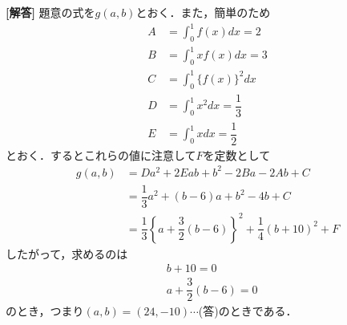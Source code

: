 \documentclass[../../main.tex]{subfiles}
\begin{document}
\begin{oframed}
  
\end{oframed}

{\bf [解答]} 題意の式を$g(a,b)$とおく．また，簡単のため
\begin{align}
  A&= \int_0^1f(x)dx=2 \\
  B&=\int_0^1xf(x)dx=3 \\
  C&=\int_0^1\{f(x)\}^2dx \\
  D&=\int_0^1x^2dx=\dfrac{1}{3} \\
  E&=\int_0^1xdx =\dfrac{1}{2}
\end{align}
とおく．するとこれらの値に注意して$F$を定数として
\begin{align}
  g(a,b)&=Da^2+2Eab+b^2-2Ba-2Ab+C \\
  &=\dfrac{1}{3}a^2+(b-6)a+b^2-4b+C \\
  &=\dfrac{1}{3}\left\{a+\dfrac{3}{2}\left(b-6\right)\right\}^2+\dfrac{1}{4}(b+10)^2+F
\end{align}
したがって，求めるのは
\begin{align}
  &b+10=0 \\
  &a+\dfrac{3}{2}\left(b-6\right)=0
\end{align}
のとき，つまり$(a,b)=(24,-10)\cdots$(答)のときである．
\newpage
\end{document}
